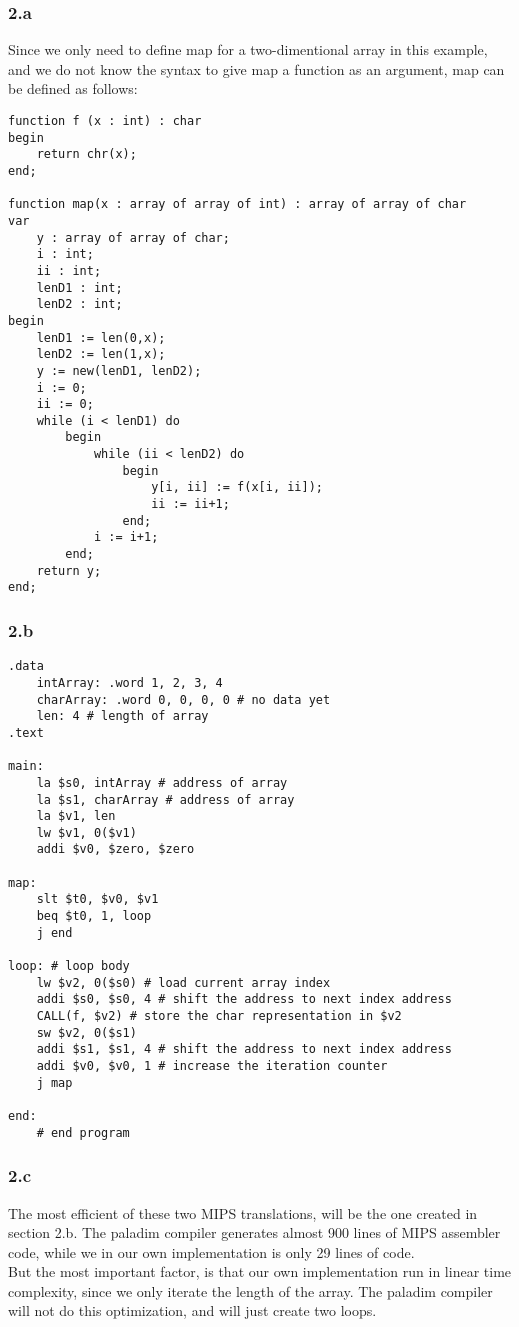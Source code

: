 \documentclass[12pt]{article}
\begin{document}
\subsubsection{2.a}

Since we only need to define map for a two-dimentional array in this example, and we do not know the syntax to give map a function as an argument, map can be defined as follows:
\begin{lstlisting}
function f (x : int) : char
begin
    return chr(x);
end; 

function map(x : array of array of int) : array of array of char
var
    y : array of array of char;
    i : int;
    ii : int;
    lenD1 : int;
    lenD2 : int;
begin
    lenD1 := len(0,x);
    lenD2 := len(1,x);
    y := new(lenD1, lenD2);
    i := 0;
    ii := 0;
    while (i < lenD1) do
        begin
            while (ii < lenD2) do
                begin
                    y[i, ii] := f(x[i, ii]);
                    ii := ii+1;
                end;
            i := i+1;
        end;
    return y;
end;
\end{lstlisting}

\pagebreak

\subsubsection{2.b}

\begin{lstlisting}
.data
    intArray: .word 1, 2, 3, 4
    charArray: .word 0, 0, 0, 0 # no data yet
    len: 4 # length of array
.text

main:
    la $s0, intArray # address of array
    la $s1, charArray # address of array
    la $v1, len
    lw $v1, 0($v1)
    addi $v0, $zero, $zero

map:
    slt $t0, $v0, $v1
    beq $t0, 1, loop
    j end

loop: # loop body
    lw $v2, 0($s0) # load current array index
    addi $s0, $s0, 4 # shift the address to next index address
    CALL(f, $v2) # store the char representation in $v2
    sw $v2, 0($s1)
    addi $s1, $s1, 4 # shift the address to next index address
    addi $v0, $v0, 1 # increase the iteration counter
    j map

end:
    # end program

\end{lstlisting}

\pagebreak

\subsubsection{2.c}

The most efficient of these two MIPS translations, will be the one created in section 2.b. The paladim compiler generates almost 900 lines of MIPS assembler code, while we in our own implementation is only 29 lines of code. \\
But the most important factor, is that our own implementation run in linear time complexity, since we only iterate the length of the array. The paladim compiler will not do this optimization, and will just create two loops.
\end{document}
